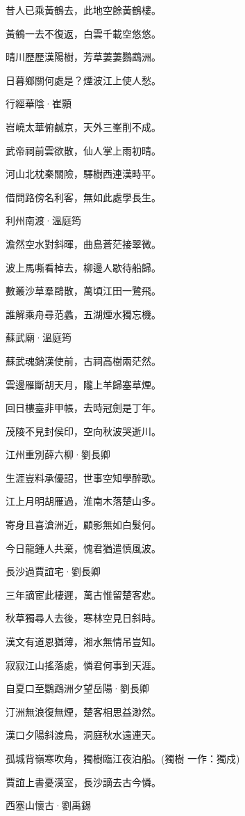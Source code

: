 \documentclass[12pt,a4paper]{ctexbook}
\begin{document}
昔人已乘黃鶴去，此地空餘黃鶴樓。\par
黃鶴一去不復返，白雲千載空悠悠。\par
晴川歷歷漢陽樹，芳草萋萋鸚鵡洲。\par
日暮鄉關何處是？煙波江上使人愁。\par
行經華陰·崔顥\par
岧嶢太華俯鹹京，天外三峯削不成。\par
武帝祠前雲欲散，仙人掌上雨初晴。\par
河山北枕秦關險，驛樹西連漢畤平。\par
借問路傍名利客，無如此處學長生。\par
利州南渡·溫庭筠\par
澹然空水對斜暉，曲島蒼茫接翠微。\par
波上馬嘶看棹去，柳邊人歇待船歸。\par
數叢沙草羣鷗散，萬頃江田一鷺飛。\par
誰解乘舟尋范蠡，五湖煙水獨忘機。\par
蘇武廟·溫庭筠\par
蘇武魂銷漢使前，古祠高樹兩茫然。\par
雲邊雁斷胡天月，隴上羊歸塞草煙。\par
回日樓臺非甲帳，去時冠劍是丁年。\par
茂陵不見封侯印，空向秋波哭逝川。\par
江州重別薛六柳·劉長卿\par
生涯豈料承優詔，世事空知學醉歌。\par
江上月明胡雁過，淮南木落楚山多。\par
寄身且喜滄洲近，顧影無如白髮何。\par
今日龍鍾人共棄，愧君猶遣慎風波。\par
長沙過賈誼宅·劉長卿\par
三年謫宦此棲遲，萬古惟留楚客悲。\par
秋草獨尋人去後，寒林空見日斜時。\par
漢文有道恩猶薄，湘水無情吊豈知。\par
寂寂江山搖落處，憐君何事到天涯。\par
自夏口至鸚鵡洲夕望岳陽·劉長卿\par
汀洲無浪復無煙，楚客相思益渺然。\par
漢口夕陽斜渡鳥，洞庭秋水遠連天。\par
孤城背嶺寒吹角，獨樹臨江夜泊船。(獨樹 一作：獨戍)\par
賈誼上書憂漢室，長沙謫去古今憐。\par
西塞山懷古·劉禹錫\par
\end{document}
